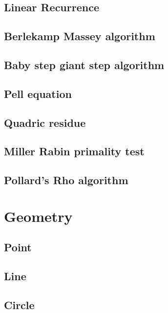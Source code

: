 \documentclass[titlepage,a4paper,10pt]{article}
\begin{document}
\begin{multicols}{2}
\begin{spacing}{0.6}
{			\subsection{Linear Recurrence}
				
			\subsection{Berlekamp Massey algorithm}
				
			\subsection{Baby step giant step algorithm}
				
			\subsection{Pell equation}
				
			\subsection{Quadric residue}
				
			\subsection{Miller Rabin primality test}
				
			\subsection{Pollard's Rho algorithm}
				
		\section{Geometry}
				
			\subsection{Point}
				
			\subsection{Line}
				
			\subsection{Circle}
				
}
\end{spacing}
\end{multicols}
\end{document}

